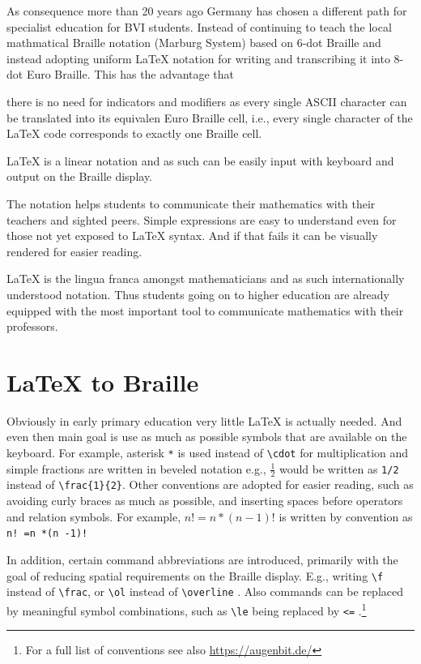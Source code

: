 \documentclass{article}
\begin{document}
As consequence more than 20 years ago Germany has chosen a different path for
specialist education for BVI students. Instead of continuing to teach the local
mathmatical Braille notation (Marburg System) based on 6-dot Braille and instead
adopting uniform {\LaTeX} notation for writing and transcribing it into 8-dot
Euro Braille. This has the advantage that 
\begin{inparaenum}
\item there is no need for indicators and
  modifiers as every single ASCII character can be translated into its equivalen
  Euro Braille cell, i.e., every single character of the {\LaTeX} code corresponds
  to exactly one Braille cell.
\item {\LaTeX} is a linear notation and as such can be easily input with
  keyboard and output on the Braille display.
\item The notation helps students to communicate their mathematics with their
  teachers and sighted peers. Simple expressions are easy to understand even for
  those not yet exposed to {\LaTeX} syntax. And if that fails it can be visually
  rendered for easier reading.
\item {\LaTeX} is the lingua franca amongst mathematicians and as such
  internationally understood notation. Thus students going on to higher
  education are already equipped with the most important tool to communicate
  mathematics with their professors.
\end{inparaenum}


\section{LaTeX to Braille}\label{sec:latex-to-braille}

Obviously in early primary education very little {\LaTeX} is actually
needed. And even then main goal is use as much as possible symbols that are
available on the keyboard. For example, asterisk \texttt{*} is used instead of
\verb+\cdot+ for multiplication and simple fractions are written in beveled
notation e.g., $\frac{1}{2}$ would be written as \texttt{1/2} instead of
\verb+\frac{1}{2}+. Other conventions are adopted for easier reading, such as
avoiding curly braces as much as possible, and inserting spaces before operators
and relation symbols. For example, ${ n! = n*(n-1)! }$ is written by convention
as \verb+n! =n *(n -1)!+

In addition, certain command abbreviations are introduced, primarily with the
goal of reducing spatial requirements on the Braille display. E.g., writing
\verb+\f+ instead of \verb+\frac+, or \verb+\ol+ instead of \verb+\overline+
. Also commands can be replaced by meaningful symbol combinations, such as
\verb+\le+ being replaced by \verb+<=+ .\footnote{For a full list of conventions
  see also \url{https://augenbit.de/}}
\end{document}
